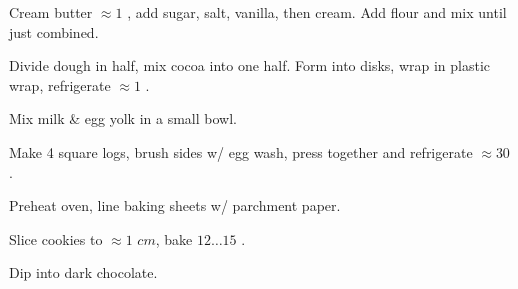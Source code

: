 \begin{preparation}
\item Cream butter $\approx 1$ \minute, add sugar, salt, vanilla, then cream.
    Add flour and mix until just combined.

\item Divide dough in half, mix cocoa into one half.
    Form into disks, wrap in plastic wrap, refrigerate $\approx1$ \hour.

\item Mix milk \& egg yolk in a small bowl.

\item Make 4 square logs, brush sides w/ egg wash, press together and
    refrigerate $\approx 30$ \minute.

\item Preheat oven, line baking sheets w/ parchment paper.

\item Slice cookies to $\approx 1$ $cm$, bake $12 \dots 15$ \minute.
\end{preparation}

\begin{variation}
\item Dip into dark chocolate.
\end{variation}

\recipeend%

